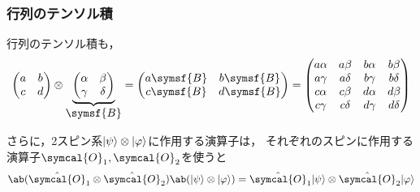 \documentclass[
    10pt,
    ]{sotsu-beamer}
\begin{document}
\begin{frame}
    \frametitle{行列のテンソル積}

    行列のテンソル積も，
    \begin{equation*}
        \begin{pmatrix}
            a & b \\ c & d
        \end{pmatrix}
        \otimes 
        \underbrace{
        \begin{pmatrix}
            \alpha & \beta \\ \gamma & \delta
        \end{pmatrix}
        }_{\text{\normalsize$\symsf{B}$}}
        = 
        \begin{pmatrix}
            a \symsf{B} & b \symsf{B} \\
            c \symsf{B} & d \symsf{B}
        \end{pmatrix}
        =
        \begin{pmatrix}
            a\alpha & a\beta & b\alpha & b\beta \\
            a\gamma & a\delta & b\gamma & b\delta \\
            c\alpha & c\beta & d\alpha & d\beta \\
            c\gamma & c\delta & d\gamma & d\delta
        \end{pmatrix}
    \end{equation*}

    さらに，2スピン系$\lvert\psi\rangle \otimes \lvert\varphi\rangle$に作用する演算子は，
    それぞれのスピンに作用する演算子$\symcal{O}_1, \symcal{O}_2$を使うと
    \begin{equation*}
        \ab(\hat{\symcal{O}}_1 \otimes \hat{\symcal{O}}_2)
        \ab(\ket{\psi} \otimes \ket{\varphi})
        = \hat{\symcal{O}}_1 \ket{\psi}
          \otimes
          \hat{\symcal{O}}_2 \ket{\varphi}
    \end{equation*}

\end{frame}
\end{document}
